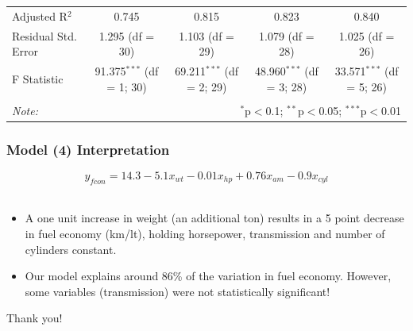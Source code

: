 \documentclass[aspectratio=169]{beamer}
\begin{document}
\begin{frame}
\begin{table}[!htbp]
\begin{tabular}{@{\extracolsep{5pt}}lcccc}
Adjusted R$^{2}$ & 0.745 & 0.815 & 0.823 & 0.840 \\ 
Residual Std. Error & 1.295 (df = 30) & 1.103 (df = 29) & 1.079 (df = 28) & 1.025 (df = 26) \\ 
F Statistic & 91.375$^{***}$ (df = 1; 30) & 69.211$^{***}$ (df = 2; 29) & 48.960$^{***}$ (df = 3; 28) & 33.571$^{***}$ (df = 5; 26) \\ 
\hline 
\hline \\[-1.8ex] 
\textit{Note:}  & \multicolumn{4}{r}{$^{*}$p$<$0.1; $^{**}$p$<$0.05; $^{***}$p$<$0.01} \\ 
\end{tabular} 
\end{table} 

\end{frame}


\begin{frame}
\frametitle{Model (4) Interpretation}
\Large
\begin{equation}
y_{fcon} = 14.3 - 5.1x_{wt} - 0.01x_{hp} + 0.76x_{am} - 0.9x_{cyl} \end{equation} \\
\vspace{.5cm}
\normalsize

\begin{itemize}
  
  \item A one unit increase in weight (an additional ton) results in a 5 point decrease in fuel economy (km/lt), holding horsepower, transmission and number of cylinders constant. 

  \item Our model explains around 86\% of the variation in fuel economy. However, some variables (transmission) were not statistically significant!
\end{itemize}

\end{frame}

\begin{frame}{}
\centering \LARGE Thank you!
\end{frame}

\end{document}
